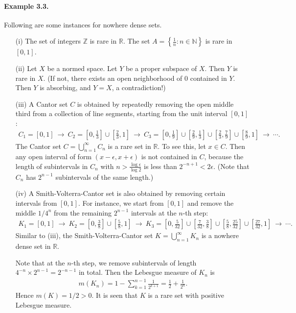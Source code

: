 \documentclass{article}
\begin{document}
\paragraph{Example 3.3.\label{example:3.3}} Following are some instances for nowhere dense sets.
\begin{itemize}
\vspace{0.1cm}
\item[(i)] The set of integers $\mathbb{Z}$ is rare in $\mathbb{R}$. The set $A=\left\{\frac{1}{n}:n\in\mathbb{N}\right\}$ is rare in $[0,1]$.
\vspace{0.1cm}
\item[(ii)] Let $X$ be a normed space. Let $Y$ be a proper subspace of $X$. Then $Y$ is rare in $X$. (If not, there exists an open neighborhood of $0$ contained in $Y$. Then $Y$ is absorbing, and $Y=X$, a contradiction!)
\vspace{0.1cm}
\item[(iii)] A Cantor set $C$ is obtained by repeatedly removing the open middle third from a collection of line segments, starting from the unit interval $[0,1]$:
\begin{align*}
	C_1=[0,1]\ \to\  C_2=\left[0,\frac{1}{3}\right]\cup\left[\frac{2}{3},1\right]\ \to\  C_3=\left[0,\frac{1}{9}\right]\cup\left[\frac{2}{9},\frac{1}{3}\right]\cup\left[\frac{2}{3},\frac{7}{9}\right]\cup\left[\frac{8}{9},1\right]\ \to\ \cdots.
\end{align*}
The Cantor set $C=\bigcup_{n=1}^\infty C_n$ is a rare set in $\mathbb{R}$. To see this, let $x\in C$. Then any open interval of form $(x-\epsilon,x+\epsilon)$ is not contained in $C$, because the length of subintervals in $C_n$ with $n>\frac{\log\epsilon}{\log 2}$ is less than $2^{-n+1}<2\epsilon$. (Note that $C_n$ has $2^{n-1}$ subintervals of the same length.)
\vspace{0.1cm}
\item[(iv)] A Smith-Volterra-Cantor set is also obtained by removing certain intervals from $[0,1]$. For instance, we start from $[0,1]$ and remove the middle $1/4^{n}$ from the remaining $2^{n-1}$ intervals at the $n$-th step:
\begin{align*}
K_1 = [0,1]\ \to\  K_2=\left[0,\frac{3}{8}\right]\cup\left[\frac{5}{8},1\right]\ \to\  K_3=\left[0,\frac{5}{32}\right]\cup\left[\frac{7}{32},\frac{3}{8}\right]\cup\left[\frac{5}{8},\frac{25}{32}\right]\cup\left[\frac{27}{32},1\right]\ \to\ \cdots.
\end{align*}
Similar to (iii), the Smith-Volterra-Cantor set $K=\bigcup_{n=1}^\infty K_n$ is a nowhere dense set in $\mathbb{R}$. \vspace{0.1cm}

Note that at the $n$-th step, we remove subintervals of length $4^{-n}\times 2^{n-1} = 2^{-n-1}$ in total. Then the Lebesgue measure of $K_n$ is
\begin{align*}
	m(K_n) = 1 - \sum_{k=1}^{n-1}\frac{1}{2^{k+1}} = \frac{1}{2} + \frac{1}{2^n}.
\end{align*}
Hence $m(K)=1/2>0$. It is seen that $K$ is a rare set with positive Lebesgue measure.
\end{itemize}
\end{document}
